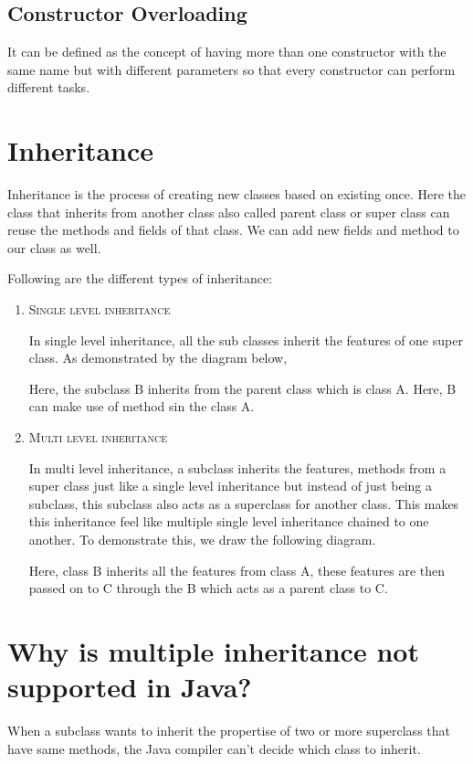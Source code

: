\documentclass[a4paper, 12pt]{scrarticle}
\begin{document}
\subsection{Constructor Overloading}
It can be defined as the concept of having more than one constructor with the same name but with different parameters so that every constructor can perform different tasks.

\section{Inheritance}
Inheritance is the process of creating new classes based on existing once. Here the class that inherits from another class  also called parent class or super class can reuse the methods and fields of that class. We can add new fields and method to our class as well.

Following are the different types of inheritance:
\begin{enumerate}
  \item \textsc{Single level inheritance}

    In single level inheritance, all the sub classes inherit the features of one super class. As demonstrated by the diagram below,
    \vskip140pt

    Here, the subclass B inherits from the parent class which is class A. Here, B can make use of method sin the class A.

  \item \textsc{Multi level inheritance}

    In multi level inheritance, a subclass inherits the features, methods from a super class just like a single level inheritance but instead of just being a subclass, this subclass also acts as a superclass for another class. This makes this inheritance feel like multiple single level
    inheritance chained to one another. To demonstrate this, we draw the following diagram.
    \vskip200pt

    Here, class B inherits all the features from class A, these features are then passed on to C through the B which acts as a parent class to C.
\end{enumerate}

\section{Why is multiple inheritance not supported in Java?}
When a subclass wants to inherit the propertise of two or more superclass that have same methods, the Java compiler can't decide which class to inherit.
\end{document}

